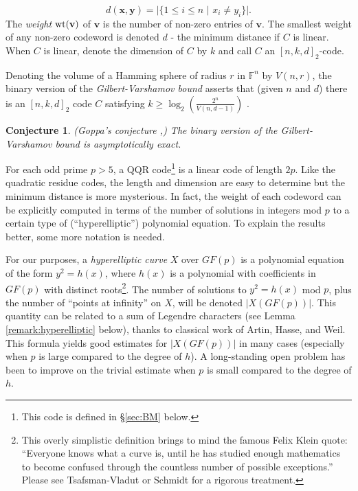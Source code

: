 \documentclass[submission%
]{dmtcs}
\newtheorem{conjecture}{Conjecture}
\def\fff{{\mathbb{F}}}
\def\wt{{\rm{wt}}}
\def\wt{{\rm{wt}}}
\begin{document}
\begin{equation}
d(\mathbf{x},\mathbf{y})=|\{1\leq i\leq n\,\,|\,\,
x_{i}\not=y_{i}\}|.\end{equation}
The {\it weight} $\wt(\mathbf{v})$ of $\mathbf{v}$ is the number
of non-zero entries of $\mathbf{v}$.  
The smallest weight of any non-zero codeword 
is denoted $d$ -  the minimum distance if $C$ is linear. 
When $C$ is linear, denote the dimension of $C$ by $k$ and
call $C$ an $[n,k,d]_2$-code.

Denoting the volume of a Hamming sphere of radius $r$ in $\fff^n$
by $V(n,r)$,
%
the binary version of the {\it Gilbert-Varshamov bound} asserts that
(given $n$ and $d$) there is an $[n,k,d]_2$ code $C$ satisfying
$k\geq \log_2(\frac{2^n}{V(n,d-1)})$ \cite{HP}.  

\begin{conjecture}
(Goppa's conjecture \cite{JV},\cite{G}) 
The binary version of the Gilbert-Varshamov bound is asymptotically exact.
\end{conjecture}

For each odd prime $p>5$, a QQR code\footnote{This code
is defined in \S \ref{sec:BM} below.} 
is a linear code of length $2p$.
Like the quadratic residue codes, the length and dimension are
easy to determine but the minimum distance is more
mysterious. In fact, the weight of each codeword can be explicitly
computed in terms of the number of solutions in integers mod $p$
to a certain type of (``hyperelliptic'') polynomial 
equation. 
To explain the results better, some more notation is needed.

For our purposes, a {\it hyperelliptic curve} $X$ over $GF(p)$ is a 
polynomial equation of 
the form $y^2=h(x)$, where $h(x)$ is a polynomial with coefficients in 
$GF(p)$ with distinct roots\footnote{This overly simplistic definition
brings to mind the famous Felix Klein quote:
``Everyone knows what a curve is, until he has studied enough 
mathematics to become confused through the countless number 
of possible exceptions.'' Please see Tsafsman-Vladut \cite{TV} or
Schmidt \cite{Sc} for a rigorous treatment.}. 
The number of solutions to $y^2=h(x)$
mod $p$, plus the number of ``points at infinity'' on $X$, 
will be denoted $|X(GF(p))|$. This quantity can be related to a sum
of Legendre characters (see Lemma \ref{remark:hyperelliptic} below), 
thanks to classical 
work of Artin, Hasse, and Weil. This formula yields good estimates for
$|X(GF(p))|$ in many cases (especially when $p$ is large
compared to the degree of $h$). A long-standing open problem has been to 
improve on the trivial estimate when $p$ is small compared to the 
degree of $h$. 
\end{document}
